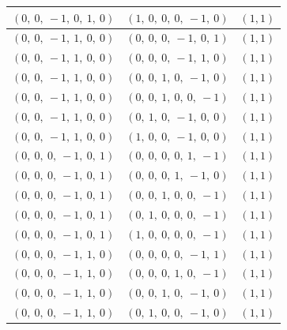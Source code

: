 \documentclass[11pt]{article}
\theoremstyle{definition}
\begin{document}
\begin{longtable}{|l|l|c|}
    \hline
    $\left( 0, \  0, \  -1, \  0, \  1, \  0\right)$ & $\left( 1, \  0, \  0, \  0, \  -1, \  0\right)$ & $(1,1)$ \\
    \hline
    $\left( 0, \  0, \  -1, \  1, \  0, \  0\right)$ & $\left( 0, \  0, \  0, \  -1, \  0, \  1\right)$ & $(1,1)$ \\
    \hline
    $\left( 0, \  0, \  -1, \  1, \  0, \  0\right)$ & $\left( 0, \  0, \  0, \  -1, \  1, \  0\right)$ & $(1,1)$ \\
    \hline
    $\left( 0, \  0, \  -1, \  1, \  0, \  0\right)$ & $\left( 0, \  0, \  1, \  0, \  -1, \  0\right)$ & $(1,1)$ \\
    \hline
    $\left( 0, \  0, \  -1, \  1, \  0, \  0\right)$ & $\left( 0, \  0, \  1, \  0, \  0, \  -1\right)$ & $(1,1)$ \\
    \hline
    $\left( 0, \  0, \  -1, \  1, \  0, \  0\right)$ & $\left( 0, \  1, \  0, \  -1, \  0, \  0\right)$ & $(1,1)$ \\
    \hline
    $\left( 0, \  0, \  -1, \  1, \  0, \  0\right)$ & $\left( 1, \  0, \  0, \  -1, \  0, \  0\right)$ & $(1,1)$ \\
    \hline
    $\left( 0, \  0, \  0, \  -1, \  0, \  1\right)$ & $\left( 0, \  0, \  0, \  0, \  1, \  -1\right)$ & $(1,1)$ \\
    \hline
    $\left( 0, \  0, \  0, \  -1, \  0, \  1\right)$ & $\left( 0, \  0, \  0, \  1, \  -1, \  0\right)$ & $(1,1)$ \\
    \hline
    $\left( 0, \  0, \  0, \  -1, \  0, \  1\right)$ & $\left( 0, \  0, \  1, \  0, \  0, \  -1\right)$ & $(1,1)$ \\
    \hline
    $\left( 0, \  0, \  0, \  -1, \  0, \  1\right)$ & $\left( 0, \  1, \  0, \  0, \  0, \  -1\right)$ & $(1,1)$ \\
    \hline
    $\left( 0, \  0, \  0, \  -1, \  0, \  1\right)$ & $\left( 1, \  0, \  0, \  0, \  0, \  -1\right)$ & $(1,1)$ \\
    \hline
    $\left( 0, \  0, \  0, \  -1, \  1, \  0\right)$ & $\left( 0, \  0, \  0, \  0, \  -1, \  1\right)$ & $(1,1)$ \\
    \hline
    $\left( 0, \  0, \  0, \  -1, \  1, \  0\right)$ & $\left( 0, \  0, \  0, \  1, \  0, \  -1\right)$ & $(1,1)$ \\
    \hline
    $\left( 0, \  0, \  0, \  -1, \  1, \  0\right)$ & $\left( 0, \  0, \  1, \  0, \  -1, \  0\right)$ & $(1,1)$ \\
    \hline
    $\left( 0, \  0, \  0, \  -1, \  1, \  0\right)$ & $\left( 0, \  1, \  0, \  0, \  -1, \  0\right)$ & $(1,1)$ \\

\end{longtable}
\end{document}
